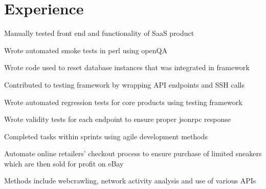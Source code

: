 \documentclass[]{deedy-resume-openfont}
\begin{document}
\begin{minipage}[t]{0.67\textwidth} 


\section{Experience}

\vspace{\topsep} %
\begin{tightemize}
\item Manually tested front end and functionality of SaaS product
\item Wrote automated smoke tests in perl using openQA
\item Wrote code used to reset database instances that was integrated in framework 
\item Contributed to testing framework by wrapping API endpoints and SSH calls
\item Wrote automated regression tests for core products using testing framework
\item Wrote validity tests for each endpoint to ensure proper jsonrpc response
\item Completed tasks within sprints using agile development methods
\end{tightemize}
\sectionsep

\begin{tightemize}
\item Automate online retailers’ checkout process to
ensure purchase of limited sneakers which are then sold for profit on eBay
\item Methods include webcrawling, network activity analysis and use of various APIs
\end{tightemize}
\sectionsep


\end{minipage}
\end{document}

